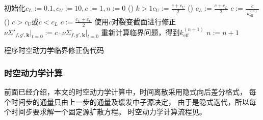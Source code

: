 \begin{algorithm}
初始化$c_L:=0.1, c_U:=10, c:=1, n:=0$\;
{
  \lIf()
  {$k>1$}{$\displaystyle c_U:=\frac{c+c_U}{2}$}
  \lElse()
  {$\displaystyle c_L:=\frac{c+c_L}{2}$}
  $\displaystyle c:=\frac{c}{\ k_\mathrm{eff}^{(n)}\ }$\;
  \lIf()
  {$c>c_U$或$c<c_L$}
  {$\displaystyle c:=\frac{c_L+c_U}{2}$}
  使用$c$对裂变截面进行修正
  $\nu\Sigma'_{f,g',\bm{k}}\Big|_{t=0} := c\cdot\nu\Sigma_{f,g',\bm{k}}\Big|_{t=0}$\;
  重新计算临界问题，得到$k_\mathrm{eff}^{(n+1)}$ \algoend
  $n:=n+1$\;
}
\caption{\label{alg:program.kinetics.keff-fix}
\ProgramName 程序时空动力学临界修正伪代码}
\end{algorithm}


\begin{comment}
\subsubsection{时空动力学与预条件算法}

由于复杂的预条件算法尚不能在GPU上并行化，只能在CPU上计算，
使得其启动(setup)时间往往较长，在静态临界计算中一般会导致总求解时间增加。
如果在每个时间步求解中分别使用这类复杂的预条件算法，则更加得不偿失。
但时空动力学计算中，材料变化一般相对较小，最后待求解的方程变化也并不大，
而预条件算法本身就是通过近似求解原方程来实现加速，
不要求与当前的方程完全符合，
所以可以在时空动力学启动计算初值时，
同时setup一个较复杂的预条件算法，得到初始状态的预条件矩阵，
在之后的每个时间步中总是使用这个预条件矩阵。

本文使用CUSP提供的SPAI预条件算法，
根据计算结果，上面这种方法对于网格数量较多的问题能够起到加速作用，
代价是时空动力学启动(init)时间增加。
\end{comment}


\subsubsection{时空动力学计算}

前面已经介绍，本文的时空动力学计算中，时间离散采用隐式向后差分格式，
每个时间步的通量只由上一步的通量及缓发中子源决定，
由于是隐式迭代，所以每个时间步要求解一个固定源扩散方程。
时空动力学计算流程见。

